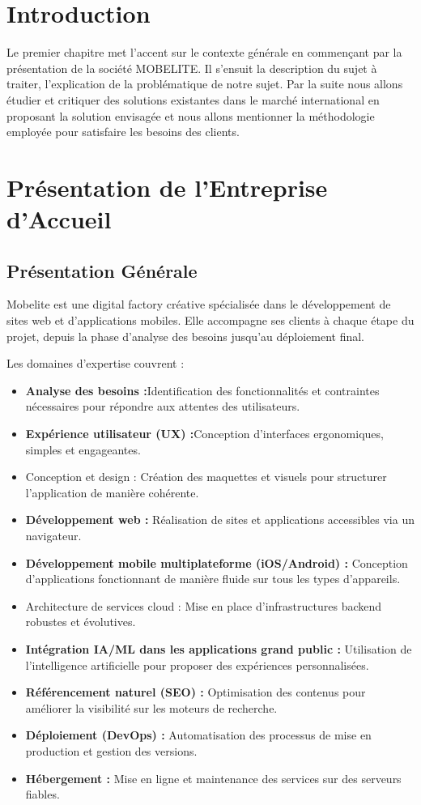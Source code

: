 \section{Introduction}
Le premier chapitre met l'accent sur le contexte générale en commençant par la présentation de la société MOBELITE. Il s'ensuit la description du sujet à traiter, l'explication de la problématique de notre sujet. Par la suite nous allons étudier et critiquer des solutions existantes dans le marché international en proposant la solution envisagée et nous allons mentionner la méthodologie employée pour satisfaire les besoins des clients. 

\section{Présentation de l’Entreprise d’Accueil}

\subsection{Présentation Générale}

Mobelite est une digital factory créative spécialisée dans le développement de sites web et d’applications mobiles. Elle accompagne ses clients à chaque étape du projet, depuis la phase d’analyse des besoins jusqu’au déploiement final.

Les domaines d’expertise couvrent :
\begin{itemize}
    \item \textbf{Analyse des besoins :}Identification des fonctionnalités et contraintes nécessaires pour répondre aux attentes des utilisateurs.
    \item \textbf{Expérience utilisateur (UX) :}Conception d’interfaces ergonomiques, simples et engageantes.
    \item Conception et design : Création des maquettes et visuels pour structurer l’application de manière cohérente.
    \item \textbf{Développement web :} Réalisation de sites et applications accessibles via un navigateur.
    \item \textbf{Développement mobile multiplateforme (iOS/Android) :} Conception d’applications fonctionnant de manière fluide sur tous les types d’appareils.
    \item Architecture de services cloud : Mise en place d’infrastructures backend robustes et évolutives.
    \item \textbf{Intégration IA/ML dans les applications grand public :} Utilisation de l’intelligence artificielle pour proposer des expériences personnalisées.
    \item \textbf{Référencement naturel (SEO) :} Optimisation des contenus pour améliorer la visibilité sur les moteurs de recherche.
    \item \textbf{Déploiement (DevOps) :} Automatisation des processus de mise en production et gestion des versions.
    \item \textbf{Hébergement :} Mise en ligne et maintenance des services sur des serveurs fiables.
\end{itemize}

